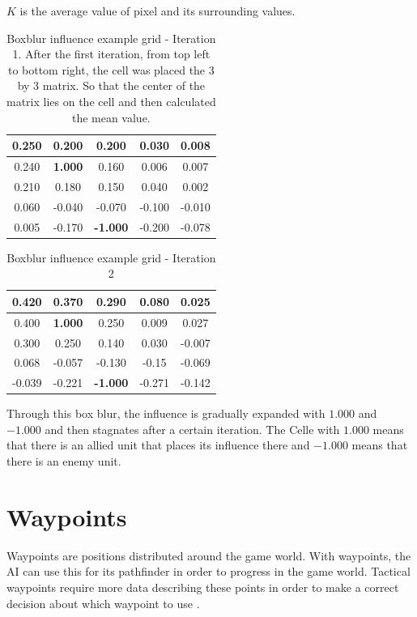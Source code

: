 \documentclass[]{report}
\begin{document}
		$K$ is the average value of pixel and its surrounding values.\citep{boxblur}
		
		\begin{table}[H]
			\centering
			\begin{tabular}{|c|c|c|c|c|}
				\hline
				0.250 & 0.200 & 0.200 & 0.030 & 0.008\\
				\hline
				0.240 & \textbf{1.000} & 0.160 & 0.006 & 0.007\\
				\hline
				0.210 & 0.180 & 0.150 & 0.040 & 0.002\\
				\hline
				0.060 & -0.040 & -0.070 & -0.100 & -0.010\\
				\hline
				0.005 & -0.170 & \textbf{-1.000} & -0.200 & -0.078\\
				\hline
				
			\end{tabular}
			\caption{Boxblur influence example grid - Iteration 1. After the first iteration, from top left to bottom right, the cell was placed the 3 by 3 matrix. So that the center of the matrix lies on the cell and then calculated the mean value.}
			\label{tab:Boxblur grid Iteration 1}
		\end{table}
		
		\begin{table}[H]
			\centering
			\begin{tabular}{|c|c|c|c|c|}
				\hline
				0.420 & 0.370 & 0.290 & 0.080 & 0.025\\
				\hline
				0.400 & \textbf{1.000} & 0.250 & 0.009 & 0.027\\
				\hline
				0.300 & 0.250 & 0.140 & 0.030 & -0.007\\
				\hline
				0.068 & -0.057 & -0.130 & -0.15 & -0.069\\
				\hline
				-0.039 & -0.221 & \textbf{-1.000} & -0.271 & -0.142\\
				\hline
				
			\end{tabular}
			\caption{Boxblur influence example grid - Iteration 2}
			\label{tab:Boxblur grid Iteration 2}
		\end{table}
		
		Through this box blur, the influence is gradually expanded with $1.000$ and $-1.000$ and then stagnates after a certain iteration. The Celle with $1.000$ means that there is an allied unit that places its influence there and $-1.000$ means that there is an enemy unit.
		
		\section{Waypoints}
		Waypoints are positions distributed around the game world. With waypoints, the \ac{AI} can use this for its pathfinder in order to progress in the game world. Tactical waypoints require more data describing these points in order to make a correct decision about which waypoint to use \citep{AIforGamesTactical}.
		
\end{document}
